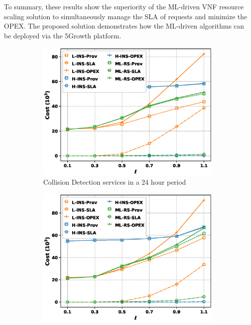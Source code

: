 \documentclass[conference, final]{IEEEtran}
\begin{document}
{To summary, these results show the superiority of the ML-driven VNF resource scaling solution to simultaneously manage the SLA of requests and minimize the OPEX. The proposed solution demonstrates how the ML-driven algorithms can be deployed via the 5Growth platform.   


\begin{figure}
\begin{subfigure}[h]{0.32\linewidth}
\includegraphics[width=\linewidth]{./figures/Automative.eps}
\caption{Collision Detection services in a 24 hour period}
\end{subfigure}
\hfill
\begin{subfigure}[h]{0.32\linewidth}
\includegraphics[width=\linewidth]{./figures/bird_eye.eps}

\end{subfigure}
\end{figure}}
\end{document}
